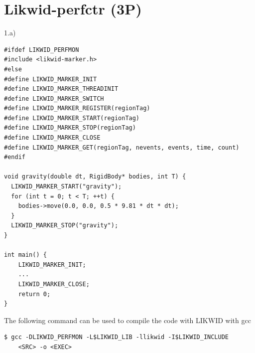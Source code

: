 \documentclass[article]{scrartcl}
\begin{document}
\section{Likwid-perfctr (3P)}
1.a)
\begin{lstlisting}[frame=single]
#ifdef LIKWID_PERFMON
#include <likwid-marker.h>
#else
#define LIKWID_MARKER_INIT
#define LIKWID_MARKER_THREADINIT
#define LIKWID_MARKER_SWITCH
#define LIKWID_MARKER_REGISTER(regionTag)
#define LIKWID_MARKER_START(regionTag)
#define LIKWID_MARKER_STOP(regionTag)
#define LIKWID_MARKER_CLOSE
#define LIKWID_MARKER_GET(regionTag, nevents, events, time, count)
#endif

void gravity(double dt, RigidBody* bodies, int T) {
  LIKWID_MARKER_START("gravity");
  for (int t = 0; t < T; ++t) {
    bodies->move(0.0, 0.0, 0.5 * 9.81 * dt * dt);
  }
  LIKWID_MARKER_STOP("gravity");
}

int main() {
    LIKWID_MARKER_INIT; 
    ...
    LIKWID_MARKER_CLOSE;
    return 0;
}
\end{lstlisting}
The following command can be used to compile the code with LIKWID with gcc
\begin{lstlisting}[frame=single]
    $ gcc -DLIKWID_PERFMON -L$LIKWID_LIB -llikwid -I$LIKWID_INCLUDE 
    <SRC> -o <EXEC> 
\end{lstlisting}
\end{document}
